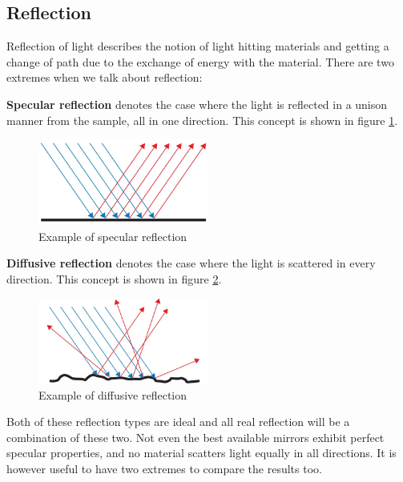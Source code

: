 \subsection{Reflection}
\label{sec:theory_reflection}
Reflection of light describes the notion of light hitting materials and getting a change of path due to the exchange of energy with the material. There are two extremes when we talk about reflection:

\textbf{Specular reflection} denotes the case where the light is reflected in a unison manner from the sample, all in one direction. This concept is shown in figure \ref{fig:specular_reflection}.

\begin{figure}[h!]
    \centering
    \includegraphics[width=0.5\textwidth]{figures/theory/Specular-Reflection.png}
    \caption{Example of specular reflection \cite{SpecularReflectionOcean}}
    \label{fig:specular_reflection}
\end{figure}

\textbf{Diffusive reflection} denotes the case where the light is scattered in every direction. This concept is shown in figure \ref{fig:diffusive_reflection}.

\begin{figure}[h!]
    \centering
    \includegraphics[width=0.5\textwidth]{figures/theory/Diffuse-Reflection.png}
    \caption{Example of diffusive reflection \cite{DiffuseReflectionOcean}}
    \label{fig:diffusive_reflection}
\end{figure}

Both of these reflection types are ideal and all real reflection will be a combination of these two. Not even the best available mirrors exhibit perfect specular properties, and no material scatters light equally in all directions. It is however useful to have two extremes to compare the results too. 

